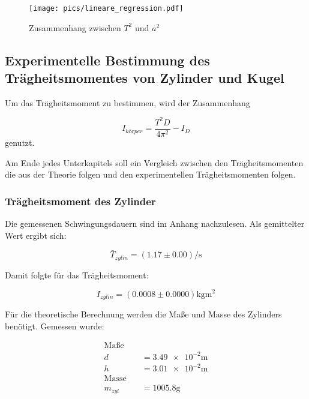 \begin{figure}
  \centering
  \texttt{[image: pics/lineare\_regression.pdf]}
  \caption{Zusammenhang zwischen $T^2$ und $a^2$}
  \label{fig:zusammenhang_a_T}
\end{figure}


\subsection{Experimentelle Bestimmung des Trägheitsmomentes von Zylinder und Kugel}

Um das Trägheitsmoment zu bestimmen, wird der Zusammenhang

\begin{equation*}
I_{körper}=\frac{T^2 D}{4\pi^2}-I_D
\end{equation*}
genutzt.

Am Ende jedes Unterkapitels soll ein Vergleich zwischen den
Trägheitsmomenten die aus der Theorie folgen und den
experimentellen Trägheitsmomenten folgen. %

\subsubsection{Trägheitsmoment des Zylinder}

Die gemessenen Schwingungsdauern sind im Anhang nachzulesen.
Als gemittelter Wert ergibt sich:

\begin{equation*}
\bar{T}_{zylin}=\left(\num{1.17}\pm\num{0.00}\right) \si{\per\second}
\end{equation*}

Damit folgte für das Trägheitsmoment:

\begin{equation}
\label{eq:traeg_zylinder_grau_exp}
I_{zylin}=\left(\num{0.0008}\pm\num{0.0000}\right) \si{\kilogram\meter\squared}
\end{equation}

Für die theoretische Berechnung werden die Maße und Masse des Zylinders benötigt.
Gemessen wurde:

\begin{align*}
\text{Maße} \quad &\\
d&=\num{3.49e-2}\si{\meter}\\
h&=\num{3.01e-2}\si{\meter}\\
\text{Masse} \quad &\\
m_{zyl}&=\num{1005.8}\si{\gram}
\end{align*}

